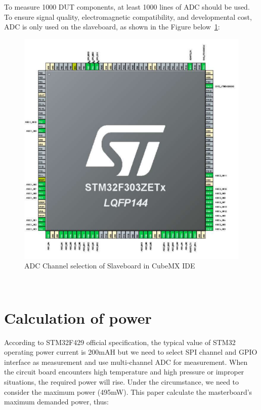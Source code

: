 To measure 1000 DUT components, at least 1000 lines of ADC should be used. To ensure signal quality, electromagnetic compatibility, and developmental cost, ADC is only used on the slaveboard, as shown in the Figure below~\ref{fig:4.3}: 

\begin{figure}[!ht]
	\centering
	\includegraphics[width=15cm]{grafiken/4.3.pdf}
	\caption{ADC Channel selection of Slaveboard in CubeMX IDE} 
	\label{fig:4.3}
\end{figure}
\FloatBarrier
\\

\section{Calculation of power}
\label{sec:Calculation of power}
According to STM32F429 official specification, the typical value of STM32 operating power current is 200mAH but we need to select SPI channel and GPIO interface as measurement and use multi-channel ADC for measurement. When the circuit board encounters high temperature and high pressure or improper situations, the required power will rise. Under the circumstance, we need to consider the maximum power (495mW). 
This paper calculate the masterboard’s maximum demanded power, thus:

